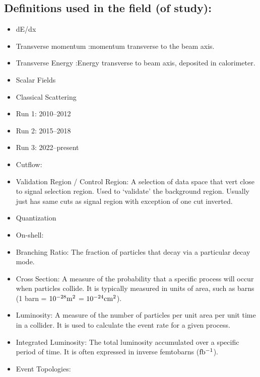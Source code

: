 \subsection{Definitions used in the field (of study):}
\begin{itemize}
	\item dE/dx
	\item Transverse momentum \pT:\@ momentum transverse to the beam axis.
	\item Transverse Energy \ET:\@ Energy transverse to beam axis, deposited in calorimeter.
	\item Scalar Fields
	\item Classical Scattering
	\item Run 1: 2010--2012
	\item Run 2: 2015--2018
	\item Run 3: 2022--present
	\item Cutflow: 
	\item Validation Region / Control Region: A selection of data space that vert close to signal selection region. Used to `validate' the background region. Usually just has same cuts as signal region with exception of one cut inverted.
	\item Quantization
	\item On-shell: 
	\item Branching Ratio: The fraction of particles that decay via a particular decay mode.
	\item Cross Section: A measure of the probability that a specific process will occur when particles
	      collide. It is typically measured in units of area, such as barns (1 barn = $\rm 10^{-28} m^2$ = $\rm 10^{-24} cm^2$).
	\item Luminosity: A measure of the number of particles per unit area per unit time in a collider. It is used to calculate the event rate for a given process.
	\item Integrated Luminosity: The total luminosity accumulated over a specific period of time. It is often expressed in inverse femtobarns (\(\rm fb^{-1}\)).
	\item Event Topologies:
\end{itemize}


